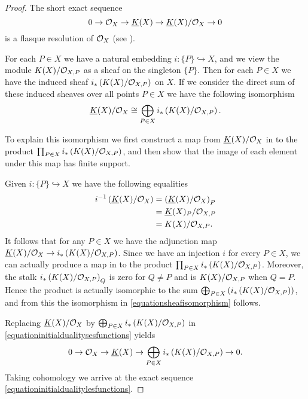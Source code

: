     \begin{proof}
    The short exact sequence
        \begin{equation}\label{equationinitialdualitysesfunctions}
        0 \rightarrow {\cal O}_X \rightarrow \underline{K}(X) \rightarrow \underline{K}(X)/{\cal O}_X \rightarrow 0
        \end{equation}
    is a flasque resolution of ${\cal O}_X$ (see \cite[Chap.\ II, ex.\ 1.16]{hart}).
    
    For each $P \in X$ we have a natural embedding $i\colon \{P\} \hookrightarrow X$, and we view the module $K(X)/{\cal O}_{X,P}$ as a sheaf on the singleton $\{P\}$.
    Then for each $P\in X$ we have the induced sheaf $i_*\left( K(X)/{\cal O}_{X,P} \right)$ on $X$.
    If we consider the direct sum of these induced sheaves over all points $P\in X$ we have the following isomorphism
        \begin{equation}\label{equationsheafisomorphism}
        \underline{K}(X)/{\cal O}_X\cong \bigoplus_{P\in X} i_*\left(K(X)/{\cal O}_{X,P}\right).
        \end{equation}
    
    
    To explain this isomorphism we first construct a map from $\underline{K}(X)/{\cal O}_X$ in to the product $\prod_{P \in X} i_*\left({K(X)}/{\cal O}_{X,P}\right)$, and then show that the image of each element under this map has finite support.
    
    Given $i\colon \{P\} \hookrightarrow X$ we have the following equalities
        \begin{align*}
        i^{-1}\left(\underline{K}(X)/{\cal O}_X\right) & = \left(\underline{K}(X)/{\cal O}_X\right)_P \\
        & = \underline{K}(X)_P/{\cal O}_{X,P} \\
        & = K(X)/{\cal O}_{X,P}.
        \end{align*}
    It follows that for any $P \in X$ we have the adjunction map $\underline{K}(X)/{\cal O}_X \rightarrow i_* \left( K(X)/{\cal O}_{X,P} \right)$.
    Since we have an injection $i$ for every $P \in X$, we can actually produce a map in to the product $\prod_{P \in X} i_*\left(K(X)/{\cal O}_{X,P}\right)$.
    Moreover, the stalk $i_*\left( K(X)/{\cal O}_{X,P} \right)_Q$ is zero for $Q \neq P$ and is $K(X)/{\cal O}_{X,P}$ when $Q = P$.
    Hence the product is actually isomorphic to the sum $\bigoplus_{P \in X} \left( i_*\left(K(X)/{\cal O}_{X,P} \right)\right)$, and from this the isomorphism in \eqref{equationsheafisomorphism} follows.
    
    Replacing $\underline{K}(X)/{\cal O}_X$ by $\bigoplus_{P\in X} i_*\left(K(X)/{\cal O}_{X,P}\right)$ in \eqref{equationinitialdualitysesfunctions} yields
        \begin{equation}\label{equationshortexactsequencefunctionsdirectsum}
        0 \rightarrow {\cal O}_X \rightarrow \underline{K}(X) \rightarrow \bigoplus_{P \in X}i_* \left( K(X)/{\cal O}_{X,P} \right) \rightarrow 0.
        \end{equation}
    Taking cohomology we arrive at the exact sequence \eqref{equationinitialdualitylesfunctions}.
    

\end{proof}
